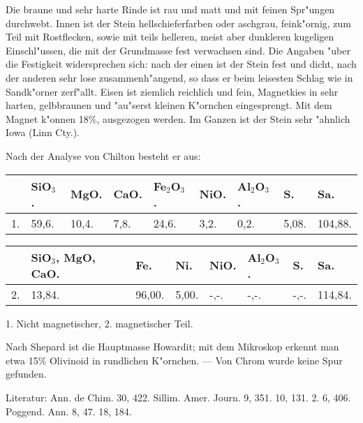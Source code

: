 \documentclass[a4paper, 11pt, oneside]{article}
\begin{document}
Die braune und sehr harte Rinde ist rau und matt und mit feinen Spr"ungen durchwebt. Innen ist der Stein hellschieferfarben oder aschgrau, feink"ornig, zum Teil mit Rostflecken, sowie mit teils helleren, meist aber dunkleren kugeligen Einschl"ussen, die mit der Grundmasse fest verwachsen sind. Die Angaben "uber die Festigkeit widersprechen sich: nach der einen ist der Stein fest und dicht, nach der anderen sehr lose zusammenh"angend, so dass er beim leisesten Schlag wie in Sandk"orner zerf"allt. Eisen ist ziemlich reichlich und fein, Magnetkies in sehr harten, gelbbraunen und "au"serst kleinen K"ornchen eingesprengt. Mit dem Magnet k"onnen 18\%, ausgezogen werden. Im Ganzen ist der Stein sehr "ahnlich Iowa (Linn Cty.).

Nach der Analyse von Chilton besteht er aus:
\begin{table}[!ht]
    \centering\swabfamily\Large
    \begin{tabular}{l l l l l l l l l}
         & SiO$_{3}$. & MgO. & CaO. & Fe$_{2}$O$_{3}$. & NiO. & Al$_{2}$O$_{3}$. & S. & Sa. \\ \hline
        1. & 59,6. & 10,4. & 7,8. & 24,6. & 3,2. & 0,2. & 5,08. & 104,88. \\
    \end{tabular}
\end{table}

\begin{table}[!ht]
    \centering\swabfamily\Large
    \begin{tabular}{l l l l l l l l}
         & SiO$_{3}$, MgO, CaO. & Fe. & Ni. & NiO. & Al$_{2}$O$_{3}$. & S. & Sa. \\ \hline
        2. & 13,84. & 96,00. & 5,00. & -,-. & -,-. & -,-. & 114,84. \\
    \end{tabular}
\end{table}

1. Nicht magnetischer, 2. magnetischer Teil.

Nach Shepard ist die Hauptmasse Howardit; mit dem Mikroskop erkennt man etwa 15\% Olivinoid in rundlichen K"ornchen. --- Von Chrom wurde keine Spur gefunden.

\normalsize
Literatur: Ann. de Chim. 30, 422. Sillim. Amer. Journ. 9, 351. 10, 131. 2. 6, 406. Poggend. Ann. 8, 47. 18, 184.

\subsection{}
\LARGE
\end{document}
